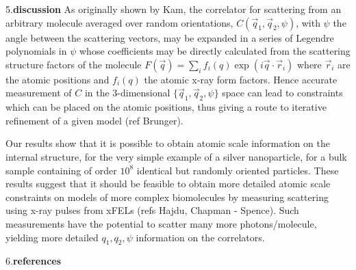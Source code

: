\documentclass [11pt,fleqn]{article}
\def \hfb {\hfill\break}
\begin{document}
5.{\bf discussion}\hfb
As originally shown by Kam, the correlator for scattering from an arbitrary molecule averaged over random orientations, $C(\vec{q}_1,\vec{q}_2,\psi)$, with $\psi$ the angle between the scattering vectors, may be expanded in a series of Legendre polynomials  in $\psi$ whose coefficients may be directly calculated from the scattering structure factors of the molecule $F(\vec {q})=\sum_i f_i(q) \exp(i\vec {q}\cdot\vec {r}_i)$ where $\vec {r}_i$ are the atomic positions and $f_i(q)$ the atomic x-ray form factors. Hence accurate measurement of $C$ in the 3-dimensional $\{\vec{q}_1,\vec{q}_2,\psi\}$ space can lead to constraints which can be placed on the atomic positions, thus giving a route to iterative refinement of a given model (ref Brunger). 

Our results show that it is possible to obtain atomic scale information on the internal structure, for the very simple example  of a silver nanoparticle, for a bulk sample containing of order $10^8$ identical but randomly oriented particles. These results suggest that it should be feasible to obtain more detailed atomic scale constraints on models  of more complex biomolecules by measuring scattering using x-ray pulses from xFELs (refs Hajdu, Chapman - Spence). Such measurements have the potential to scatter many more photons/molecule, yielding more detailed $q_1,q_2,\psi$ information on the correlators. 

6.{\bf references}
\end{document}
